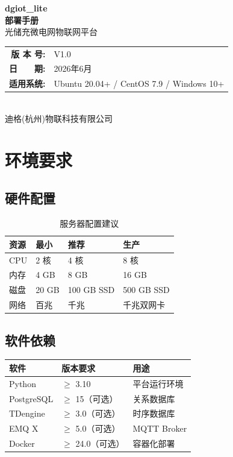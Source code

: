\documentclass[12pt,a4paper]{ctexart}
\begin{document}
\begin{titlepage}
\centering\vspace*{3cm}
{\Huge\bfseries\sffamily dgiot\_lite}\\[0.8cm]
{\LARGE\bfseries 部署手册}\\[1.5cm]
{\large 光储充微电网物联网平台}\\[2cm]
{\large\begin{tabular}{rl}
\textbf{版 本 号:} & V1.0 \\
\textbf{日　　期:} & 2026年6月 \\
\textbf{适用系统:} & Ubuntu 20.04+ / CentOS 7.9 / Windows 10+ \\
\end{tabular}}\\[1.5cm]
{\normalsize 迪格(杭州)物联科技有限公司}
\end{titlepage}

\newpage\tableofcontents\newpage

\section{环境要求}

\subsection{硬件配置}

\begin{table}[H]\centering
\caption{服务器配置建议}
\begin{tabular}{p{3cm}p{3cm}p{3cm}p{3cm}}
\toprule\textbf{资源} & \textbf{最小} & \textbf{推荐} & \textbf{生产} \\
\midrule
CPU  & 2 核  & 4 核  & 8 核 \\
内存 & 4 GB  & 8 GB  & 16 GB \\
磁盘 & 20 GB & 100 GB SSD & 500 GB SSD \\
网络 & 百兆  & 千兆  & 千兆双网卡 \\
\bottomrule
\end{tabular}
\end{table}

\subsection{软件依赖}

\begin{table}[H]\centering
\begin{tabular}{p{3cm}p{5cm}p{5cm}}
\toprule\textbf{软件} & \textbf{版本要求} & \textbf{用途} \\
\midrule
Python  & $\geq$ 3.10 & 平台运行环境 \\
PostgreSQL & $\geq$ 15（可选） & 关系数据库 \\
TDengine   & $\geq$ 3.0（可选） & 时序数据库 \\
EMQ X      & $\geq$ 5.0（可选） & MQTT Broker \\
Docker     & $\geq$ 24.0（可选） & 容器化部署 \\
\bottomrule
\end{tabular}
\end{table}
\end{document}
